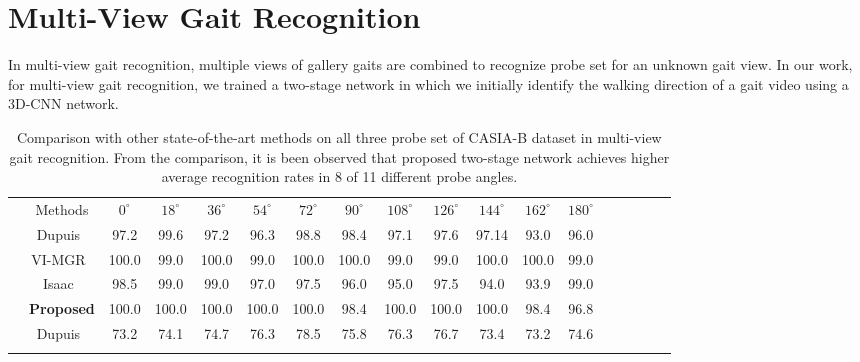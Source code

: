 \section{Multi-View Gait Recognition}
In multi-view gait recognition, multiple views of gallery gaits are combined to recognize probe set for an unknown gait view. In our work, for multi-view gait recognition, we trained a two-stage network in which we initially identify the walking direction of a gait video using a 3D-CNN network. 

\begin{table}[t]
	\centering
	\caption{Comparison with other state-of-the-art methods on all three probe set of CASIA-B dataset in multi-view gait recognition. From the comparison, it is been observed that proposed two-stage network achieves higher average recognition rates in 8 of 11 different probe angles.\label{table:comp_multi_view}}
	\setlength{\tabcolsep}{4pt}
	\small
	{\begin{tabular*}{\textwidth}{|c|c|cccccccccccccccc} \cline{1-13}\rule{0pt}{3ex}
		&Methods &${0^{\circ}}$ &${18^{\circ}}$  &${36^{\circ}}$ &${54^{\circ}}$ &${72^{\circ}}$	&${90^{\circ}}$	&${108^{\circ}}$ &${126^{\circ}}$ &${144^{\circ}}$ &${162^{\circ}}$  &${180^{\circ}}$ \\\cline{1-13}\rule{0pt}{3ex}
					
		\multirow{4}{*}{\rotatebox{90}{Normal}} &Dupuis~\cite{Dupuis_13} &97.2 &99.6 &97.2 &96.3 &98.8 &98.4 &97.1 &97.6 &97.14 &93.0 &96.0 \\\cline{2-13}\rule{0pt}{3ex}
		
		&VI-MGR~\cite{Choudhury_15} &100.0 &99.0 &100.0 &99.0 &100.0 &100.0 &99.0 &99.0 &100.0 &100.0 &99.0 \\ \cline{2-13}\rule{0pt}{3ex}
		
		&Isaac~\cite{Isaac_17} &98.5 &99.0 &99.0 &97.0 &97.5 &96.0 &95.0 &97.5 &94.0 &93.9 &99.0 \\\cline{2-13}\rule{0pt}{3ex}
		
		&\textbf{Proposed} &100.0  &100.0  &100.0  &100.0  &100.0  &98.4  &100.0  &100.0  &100.0  &98.4  &96.8 \\\cline{1-13}\rule{0pt}{3ex}
	
	
	
		\multirow{4}{*}{\rotatebox{90}{Bag}} &Dupuis~\cite{Dupuis_13} &73.2 &74.1 &74.7 &76.3 &78.5 &75.8 &76.3 &76.7 &73.4 &73.2 &74.6 \\\cline{2-13}\rule{0pt}{3ex} 


\end{tabular*}}
\end{table}
